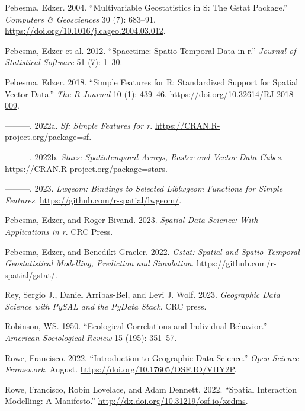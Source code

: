 \documentclass[
  letterpaper,
  DIV=11,
  numbers=noendperiod,
  oneside]{scrreprt}
\newlength{\cslhangindent}
\newenvironment{CSLReferences}[2] %
 {\begin{list}{}{%
  \setlength{\itemindent}{0pt}
  \setlength{\leftmargin}{0pt}
  \setlength{\parsep}{0pt}
  \ifodd #1
   \setlength{\leftmargin}{\cslhangindent}
   \setlength{\itemindent}{-1\cslhangindent}
  \fi
  \setlength{\itemsep}{#2\baselineskip}}}
 {\end{list}}
\begin{document}
\begin{CSLReferences}{1}{0}
Pebesma, Edzer. 2004. {``Multivariable Geostatistics in S: The Gstat
Package.''} \emph{Computers \& Geosciences} 30 (7): 683--91.
\url{https://doi.org/10.1016/j.cageo.2004.03.012}.

Pebesma, Edzer et al. 2012. {``Spacetime: Spatio-Temporal Data in r.''}
\emph{Journal of Statistical Software} 51 (7): 1--30.

Pebesma, Edzer. 2018. {``{Simple Features for R: Standardized Support
for Spatial Vector Data}.''} \emph{{The R Journal}} 10 (1): 439--46.
\url{https://doi.org/10.32614/RJ-2018-009}.

---------. 2022a. \emph{Sf: Simple Features for r}.
\url{https://CRAN.R-project.org/package=sf}.

---------. 2022b. \emph{Stars: Spatiotemporal Arrays, Raster and Vector
Data Cubes}. \url{https://CRAN.R-project.org/package=stars}.

---------. 2023. \emph{Lwgeom: Bindings to Selected Liblwgeom Functions
for Simple Features}. \url{https://github.com/r-spatial/lwgeom/}.

Pebesma, Edzer, and Roger Bivand. 2023. \emph{Spatial Data Science: With
Applications in r}. CRC Press.

Pebesma, Edzer, and Benedikt Graeler. 2022. \emph{Gstat: Spatial and
Spatio-Temporal Geostatistical Modelling, Prediction and Simulation}.
\url{https://github.com/r-spatial/gstat/}.

Rey, Sergio J., Daniel Arribas-Bel, and Levi J. Wolf. 2023.
\emph{Geographic Data Science with PySAL and the PyData Stack}. CRC
press.

Robinson, WS. 1950. {``Ecological Correlations and Individual
Behavior.''} \emph{American Sociological Review} 15 (195): 351--57.

Rowe, Francisco. 2022. {``Introduction to Geographic Data Science.''}
\emph{Open Science Framework}, August.
\url{https://doi.org/10.17605/OSF.IO/VHY2P}.

Rowe, Francisco, Robin Lovelace, and Adam Dennett. 2022. {``Spatial
Interaction Modelling: A Manifesto.''}
\url{http://dx.doi.org/10.31219/osf.io/xcdms}.


\end{CSLReferences}
\end{document}
